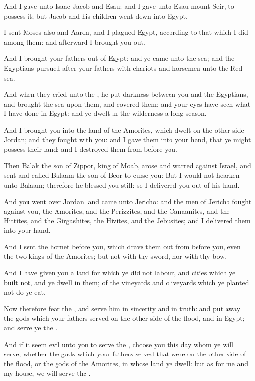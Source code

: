 \verse And I gave unto Isaac Jacob and Esau: and I gave unto Esau mount Seir, to possess it; but Jacob and his children went down into Egypt.

\verse I sent Moses also and Aaron, and I plagued Egypt, according to that which I did among them: and afterward I brought you out.

\verse And I brought your fathers out of Egypt: and ye came unto the sea; and the Egyptians pursued after your fathers with chariots and horsemen unto the Red sea.

\verse And when they cried unto the \LORD, he put darkness between you and the Egyptians, and brought the sea upon them, and covered them; and your eyes have seen what I have done in Egypt: and ye dwelt in the wilderness a long season.

\verse And I brought you into the land of the Amorites, which dwelt on the other side Jordan; and they fought with you: and I gave them into your hand, that ye might possess their land; and I destroyed them from before you.

\verse Then Balak the son of Zippor, king of Moab, arose and warred against Israel, and sent and called Balaam the son of Beor to curse you: \verse But I would not hearken unto Balaam; therefore he blessed you still: so I delivered you out of his hand.

\verse And you went over Jordan, and came unto Jericho: and the men of Jericho fought against you, the Amorites, and the Perizzites, and the Canaanites, and the Hittites, and the Girgashites, the Hivites, and the Jebusites; and I delivered them into your hand.

\verse And I sent the hornet before you, which drave them out from before you, even the two kings of the Amorites; but not with thy sword, nor with thy bow.

\verse And I have given you a land for which ye did not labour, and cities which ye built not, and ye dwell in them; of the vineyards and oliveyards which ye planted not do ye eat.

\verse Now therefore fear the \LORD, and serve him in sincerity and in truth: and put away the gods which your fathers served on the other side of the flood, and in Egypt; and serve ye the \LORD.

\verse And if it seem evil unto you to serve the \LORD, choose you this day whom ye will serve; whether the gods which your fathers served that were on the other side of the flood, or the gods of the Amorites, in whose land ye dwell: but as for me and my house, we will serve the \LORD.

